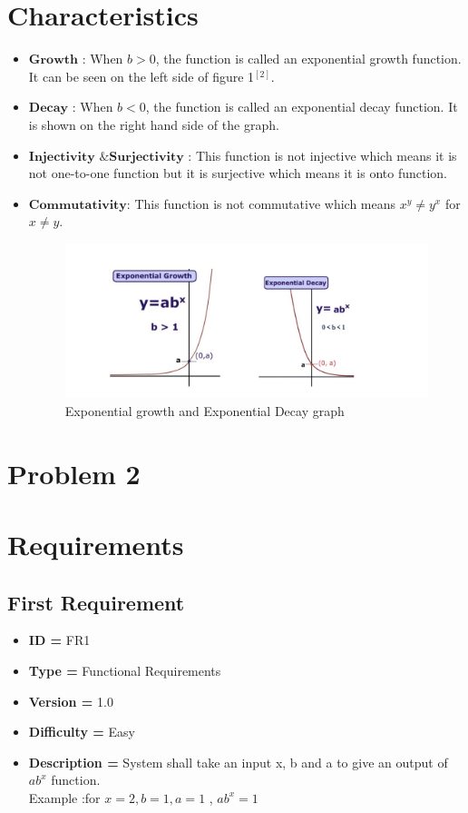 \documentclass[a4paper, 11pt]{article}
\begin{document}
\section{Characteristics}

\begin{itemize}
  \item $\boldsymbol{Growth}$ : When $b > 0$, the function is called an exponential growth function. It can be seen on the left side of figure 1$^{[2]}$.

  \item $\boldsymbol{Decay}$ : When $b < 0$, the function is called an exponential decay function. It is shown on the right hand side of the graph.
  
  \item $ \textbf{Injectivity \& Surjectivity}$ : This function is not injective which means it is not one-to-one function but it is surjective which means it is onto function.
  
   \item $\boldsymbol{Commutativity}$:  This function is not commutative which means $x^y \ne y^x $ for $x\ne y$.
  \begin{figure}[H]
\includegraphics[width=18cm]{exp.png}
\caption{Exponential growth and Exponential Decay graph}
\label{exp}
\end{figure}
\end{itemize}

\newpage
\section*{Problem 2}
\section*{Requirements}
    \subsection*{First Requirement}
    \begin{itemize}
        \item \textbf{ID = } FR1
        \item \textbf{Type = } Functional Requirements
        \item \textbf{Version = } 1.0
        \item \textbf{Difficulty = } Easy
        \item \textbf{Description = }System shall take an input x, b and a  to give an output of $ab^x$ function.\\
        Example :for  $x = 2, b = 1, a = 1 $ , $ ab^x = 1$
    \end{itemize}
\end{document}
